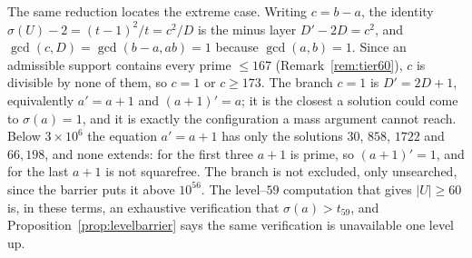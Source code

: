 \documentclass[11pt]{article}
\theoremstyle{definition}
\begin{document}
The same reduction locates the extreme case. Writing $c=b-a$, the identity
$\sigma(U)-2=(t-1)^2/t=c^2/D$ is the minus layer $D'-2D=c^2$, and $\gcd(c,D)=\gcd(b-a,ab)=1$ because
$\gcd(a,b)=1$. Since an admissible support contains every prime $\le167$
\textup{(}Remark~\ref{rem:tier60}\textup{)}, $c$ is divisible by none of them, so $c=1$ or
$c\ge173$. The branch $c=1$ is $D'=2D+1$, equivalently $a'=a+1$ and $(a+1)'=a$; it is the closest a
solution could come to $\sigma(a)=1$, and it is exactly the configuration a mass argument cannot
reach. Below $3\times10^{6}$ the equation $a'=a+1$ has only the solutions $30$, $858$, $1722$ and
$66{,}198$, and none extends: for the first three $a+1$ is prime, so $(a+1)'=1$, and for the last
$a+1$ is not squarefree. The branch is not excluded, only unsearched, since the barrier puts it above
$10^{56}$. The level--$59$
computation that gives $|U|\ge60$ is, in these terms, an exhaustive verification that
$\sigma(a)>t_{59}$, and Proposition~\ref{prop:levelbarrier} says the same verification is unavailable
one level up.
\end{document}

